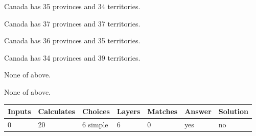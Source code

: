 \documentclass[12pt]{article}
\begin{document}
 
Canada has  %
35 provinces and  %
34 territories.
 
 
Canada has  %
37 provinces and  %
37 territories.
 
 
Canada has  %
36 provinces and  %
35 territories.
 
 
Canada has  %
34 provinces and  %
39 territories.
 
 
 None of above.
 
 
\noindent{}
 
 
 None of above.
 
 
\noindent{}
 
 
   
   
   
   
\noindent\begin{tabular}{|l|l|l|l|l|l|l|}
 \hline
Inputs & Calculates & Choices & Layers & Matches & Answer & Solution \\ \hline
           0  & 
          20  & 
           6
  simple  
  & 
           6  & 
           0  & 
  yes & 
  no 
  \\ \hline
 \end{tabular}
   
   
   
   
\noindent{}
   
   
  
\end{document}
